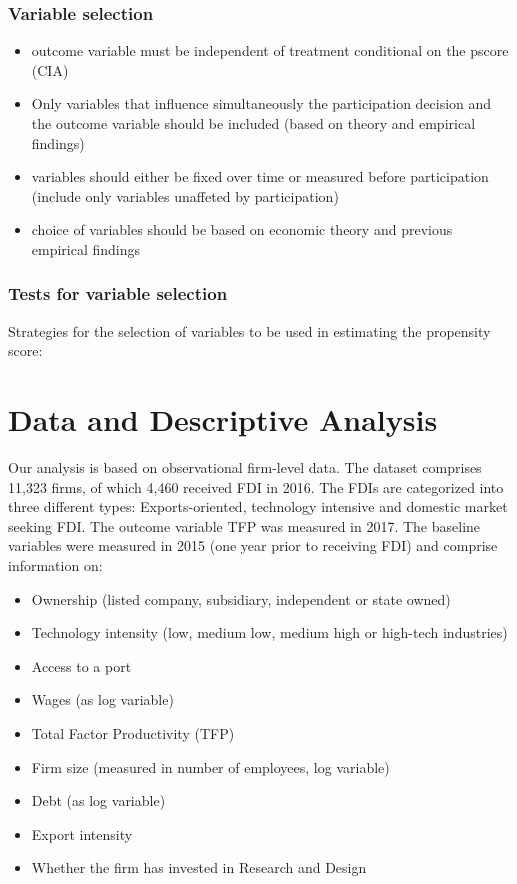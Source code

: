 \documentclass[a4paper,11pt]{scrartcl}
\begin{document}
\subsubsection*{Variable selection}
\begin{itemize}
\item outcome variable must be independent of treatment conditional on the pscore (CIA)
\item Only variables that influence simultaneously the participation decision and the outcome variable should be included (based on theory and empirical findings)
\item variables should either be fixed over time or measured before participation (include only variables unaffeted by participation)
\item choice of variables should be based on economic theory and previous empirical findings
\end{itemize}

\subsubsection*{Tests for variable selection}
Strategies for the selection of variables to be used in estimating the propensity score:



\section{Data and Descriptive Analysis}
Our analysis is based on observational firm-level data. The dataset comprises 11,323 firms, of which 4,460 received FDI in 2016. The FDIs are categorized into three different types: Exports-oriented, technology intensive and domestic market seeking FDI. The outcome variable TFP was measured in 2017. The baseline variables were measured in 2015 (one year prior to receiving FDI) and comprise information on:

\begin{itemize}
\item Ownership (listed company, subsidiary, independent or state owned)
\item Technology intensity (low, medium low, medium high or high-tech industries) 
\item Access to a port
\item Wages (as log variable)
\item Total Factor Productivity (TFP)
\item Firm size (measured in number of employees, log variable)
\item Debt (as log variable)
\item Export intensity
\item Whether the firm has invested in Research and Design
\end{itemize}
\end{document}
